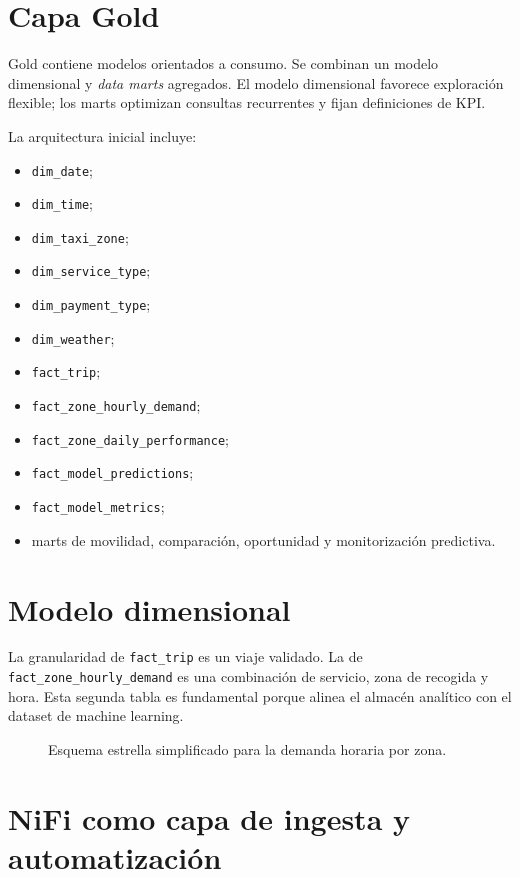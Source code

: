 \section{Capa Gold}

Gold contiene modelos orientados a consumo. Se combinan un modelo dimensional y \textit{data marts} agregados. El modelo dimensional favorece exploración flexible; los marts optimizan consultas recurrentes y fijan definiciones de KPI\@.

La arquitectura inicial incluye:

\begin{itemize}
\item \texttt{dim\_date};
\item \texttt{dim\_time};
\item \texttt{dim\_taxi\_zone};
\item \texttt{dim\_service\_type};
\item \texttt{dim\_payment\_type};
\item \texttt{dim\_weather};
\item \texttt{fact\_trip};
\item \texttt{fact\_zone\_hourly\_demand};
\item \texttt{fact\_zone\_daily\_performance};
\item \texttt{fact\_model\_predictions};
\item \texttt{fact\_model\_metrics};
\item marts de movilidad, comparación, oportunidad y monitorización predictiva.
\end{itemize}

\section{Modelo dimensional}

La granularidad de \texttt{fact\_trip} es un viaje validado. La de \texttt{fact\_zone\_hourly\_demand} es una combinación de servicio, zona de recogida y hora. Esta segunda tabla es fundamental porque alinea el almacén analítico con el dataset de machine learning.

\begin{figure}[H]
\centering
{}
\caption{Esquema estrella simplificado para la demanda horaria por zona.}%
\label{fig:star-demand}%
\end{figure}

\section{NiFi como capa de ingesta y automatización}

